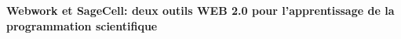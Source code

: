 \documentclass[10pt]{article}
\def\titre#1{\begin{center}{\Large{\bf #1}}\end{center}}
\begin{document}
\thispagestyle{empty}
%
%
%
%
\def\Titre{Webwork et SageCell: deux outils WEB 2.0 pour l'apprentissage de la programmation scientifique}
%
\def\NomOrateur{Marc BUFFAT}
\def\AdresseCourteOrateur{Universit\'e Claude Bernard Lyon 1}
\def\AdresseLongueOrateur{professeur au d\'epartement de m\'ecanique\\Universit\'e Lyon 1\\ Batiment Omega\\ 43 bvd du 11 nov 1918\\ 69622 Villeurbanne CEDEX}
\def\EmailOrateur{marc.buffat@univ-lyon1.fr}
%
%
%
%
\titre{\Titre}%
\end{document}
